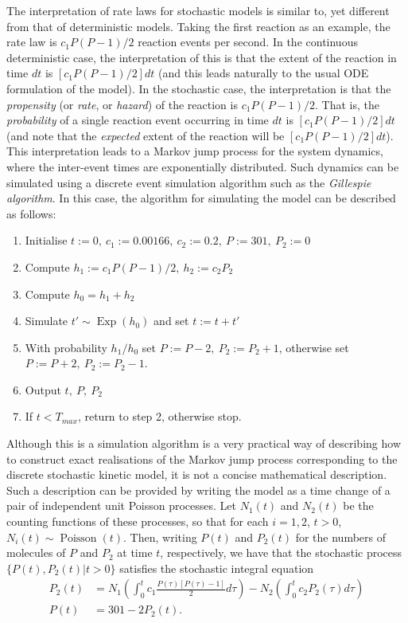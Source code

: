 The interpretation of rate laws for stochastic models is similar
to, yet different from that of deterministic models. Taking the
first reaction as an example, the rate law is $c_1P(P-1)/2$ reaction
events per second. In the continuous deterministic case, the
interpretation of this is that the extent of the reaction in time
$dt$ is $[c_1P(P-1)/2]dt$ (and this leads naturally to the usual ODE
formulation of the model). In the stochastic case, the
interpretation is that the \emph{propensity} (or \emph{rate}, or
\emph{hazard}) of the reaction is $c_1P(P-1)/2$. That is, the
\emph{probability} of a single reaction event occurring in time
$dt$ is $[c_1P(P-1)/2]dt$ (and note that the \emph{expected} extent of
the reaction will be $[c_1P(P-1)/2]dt$). This interpretation leads to a Markov
jump process for the system dynamics, where the inter-event times
are exponentially distributed. Such dynamics can be simulated
using a discrete event simulation algorithm such as the
\emph{Gillespie algorithm}. In this case, the algorithm for
simulating the model can be described as follows:
\begin{enumerate}
\item Initialise $t:=0,\ c_1:=0.00166,\ c_2:=0.2,\ P:=301,\ P_2:=0$
\item Compute $h_1:=c_1P(P-1)/2,\ h_2:=c_2P_2$
\item Compute $h_0=h_1+h_2$
\item Simulate $t'\sim \operatorname{Exp}(h_0)$ and set $t:=t+t'$
\item With probability $h_1/h_0$ set $P:=P-2,\ P_2:=P_2+1$,
otherwise set $P:=P+2,\ P_2:=P_2-1$.
\item Output $t,\ P,\ P_2$
\item If $t<T_{max}$, return to step 2, otherwise stop.
\end{enumerate}
Although this is a simulation algorithm is a very practical way of
describing how to construct exact realisations of the Markov jump
process corresponding to the discrete stochastic kinetic model, it
is not a concise mathematical description. Such a description can
be provided by writing the model as a time change of a pair of
independent unit Poisson processes. Let $N_1(t)$ and $N_2(t)$ be
the counting functions of these processes, so that for each
$i=1,2$, $t>0$, $N_i(t)\sim \operatorname{Poisson}(t)$. Then,
writing $P(t)$ and $P_2(t)$ for the numbers of molecules of $P$
and $P_2$ at time $t$, respectively, we have that the stochastic process
$\{P(t),P_2(t)|t>0\}$ satisfies the stochastic integral equation
\begin{align*}
P_2(t) &= N_1\left(\int_0^t
c_1\frac{P(\tau)[P(\tau)-1]}{2}d\tau\right) - N_2\left(\int_0^t
c_2 P_2(\tau)d\tau\right) \\
P(t) &= 301 - 2P_2(t).
\end{align*}
